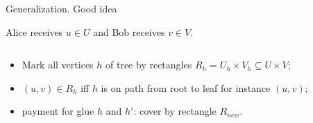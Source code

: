 \begin{frame}{Generalization. Good idea}

    Alice receives $u \in U$ and Bob receives $v \in V$.

    \begin{columns}[t]
		\begin{column}{0.6\textwidth}
            \begin{itemize}
                \item<2-> Mark all vertices $h$ of tree by rectangles $R_h = U_h \times V_h \subseteq U \times V$;
	            \item<4-> $(u, v) \in R_h$ iff $h$ is on path from root to leaf for instance $(u, v)$;
    		    \item<5-> payment for glue $h$ and $h'$: cover by rectangle $R_{new}$.
	        \end{itemize}
            
        \end{column}
        
		\begin{column}{0.3\textwidth}
		\end{column}
	\end{columns}
\end{frame}